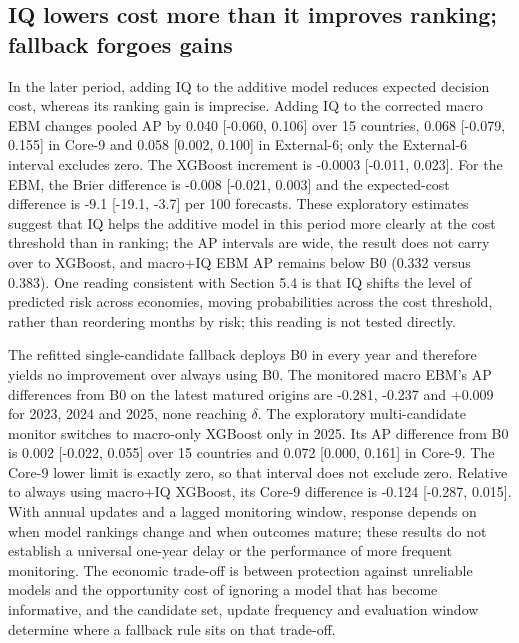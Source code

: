 \documentclass[preprint,12pt,authoryear]{elsarticle}
\begin{document}
\subsection{IQ lowers cost more than it improves ranking; fallback forgoes gains}
In the later period, adding IQ to the additive model reduces expected decision cost, whereas its ranking gain is imprecise. Adding IQ to the corrected macro EBM changes pooled AP by 0.040 [-0.060, 0.106] over 15 countries, 0.068 [-0.079, 0.155] in Core-9 and 0.058 [0.002, 0.100] in External-6; only the External-6 interval excludes zero. The XGBoost increment is -0.0003 [-0.011, 0.023]. For the EBM, the Brier difference is -0.008 [-0.021, 0.003] and the expected-cost difference is -9.1 [-19.1, -3.7] per 100 forecasts. These exploratory estimates suggest that IQ helps the additive model in this period more clearly at the cost threshold than in ranking; the AP intervals are wide, the result does not carry over to XGBoost, and macro+IQ EBM AP remains below B0 (0.332 versus 0.383). One reading consistent with Section 5.4 is that IQ shifts the level of predicted risk across economies, moving probabilities across the cost threshold, rather than reordering months by risk; this reading is not tested directly.

The refitted single-candidate fallback deploys B0 in every year and therefore yields no improvement over always using B0. The monitored macro EBM's AP differences from B0 on the latest matured origins are -0.281, -0.237 and +0.009 for 2023, 2024 and 2025, none reaching $\delta$. The exploratory multi-candidate monitor switches to macro-only XGBoost only in 2025. Its AP difference from B0 is 0.002 [-0.022, 0.055] over 15 countries and 0.072 [0.000, 0.161] in Core-9. The Core-9 lower limit is exactly zero, so that interval does not exclude zero. Relative to always using macro+IQ XGBoost, its Core-9 difference is -0.124 [-0.287, 0.015]. With annual updates and a lagged monitoring window, response depends on when model rankings change and when outcomes mature; these results do not establish a universal one-year delay or the performance of more frequent monitoring. The economic trade-off is between protection against unreliable models and the opportunity cost of ignoring a model that has become informative, and the candidate set, update frequency and evaluation window determine where a fallback rule sits on that trade-off.
\end{document}
